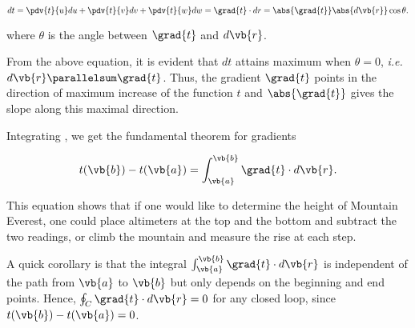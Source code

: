 \documentclass[english,a4paper,12pt]{report}
\begin{document}
\begin{equation}
    dt = \pdv{t}{u}du + \pdv{t}{v}dv + \pdv{t}{w}dw = \grad{t} \cdot dr = \abs{\grad{t} }\abs{d \vb{r} }\cos \theta   . \label{dt} 
\end{equation}

where \(\theta\) is the angle between \(\grad{t}\) and \(d\vb{r}\).
	
From the above equation, it is evident that \(dt\) attains maximum when \(\theta = 0\), \textit{i.e.} \(d\vb{r} \parallelsum \grad{t}\). Thus, the gradient \(\grad{t}\) points in the direction of maximum increase of the function \(t\) and \(\abs{\grad{t}}\) gives the slope along this maximal direction.


	
Integrating , we get the fundamental theorem for gradients

\begin{equation} 
	t(\vb{b}) - t(\vb{a}) = \int_{\vb{a}}^{\vb{b}} \grad{t} \cdot d\vb{r}. 
\end{equation}
	
This equation shows that if one would like to determine the height of Mountain Everest, one could place altimeters at the top and the bottom and subtract the two readings, or climb the mountain and measure the rise at each step.

A quick corollary is that the integral \(\int_{\vb{a}}^{\vb{b}} \grad{t} \cdot d\vb{r}\) is independent of the path from \(\vb{a}\) to \(\vb{b}\) but only depends on the beginning and end points. Hence, \(\oint_{C} \grad{t} \cdot d\vb{r} = 0\) for any closed loop, since \(t(\vb{b}) - t(\vb{a}) = 0\).
	
\end{document}
